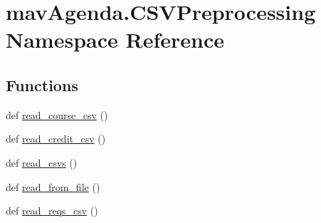 \hypertarget{namespacemavAgenda_1_1CSVPreprocessing}{}\section{mav\+Agenda.\+C\+S\+V\+Preprocessing Namespace Reference}
\label{namespacemavAgenda_1_1CSVPreprocessing}
\subsection*{Functions}
\begin{DoxyCompactItemize}
\item 
def \mbox{\hyperlink{namespacemavAgenda_1_1CSVPreprocessing_a55df24ef15e8110c2aa1b3413eed36f9}{read\+\_\+course\+\_\+csv}} ()
\item 
def \mbox{\hyperlink{namespacemavAgenda_1_1CSVPreprocessing_a9653d802c569f94888256343d5f8bfd1}{read\+\_\+credit\+\_\+csv}} ()
\item 
def \mbox{\hyperlink{namespacemavAgenda_1_1CSVPreprocessing_a0092c9e65194decbabf6bb32584c7d45}{read\+\_\+csvs}} ()
\item 
def \mbox{\hyperlink{namespacemavAgenda_1_1CSVPreprocessing_abbb7d5587b5823e95cb282ce49899bdd}{read\+\_\+from\+\_\+file}} ()
\item 
def \mbox{\hyperlink{namespacemavAgenda_1_1CSVPreprocessing_a6b9b66f70f008c5046d3ad8264f50ab5}{read\+\_\+reqs\+\_\+csv}} ()
\end{DoxyCompactItemize}
